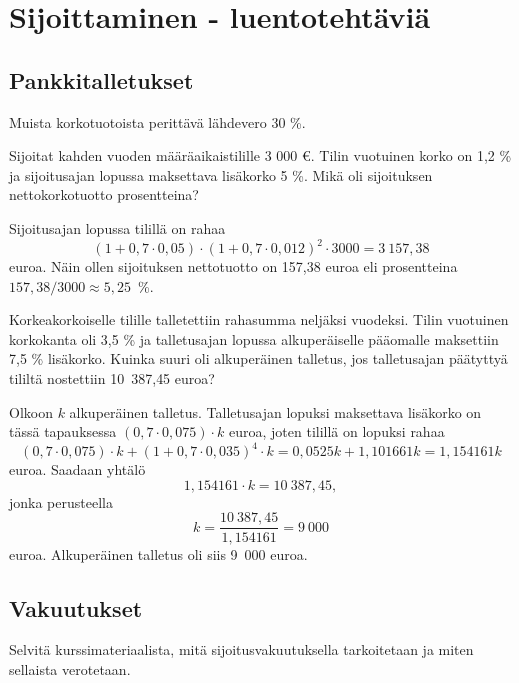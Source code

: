 \documentclass{article}\usepackage[]{graphicx}\usepackage[]{color}
\begin{document}
\section*{Sijoittaminen - luentotehtäviä}

\subsection*{Pankkitalletukset}

Muista korkotuotoista perittävä lähdevero 30 \%.

\begin{question} 
  Sijoitat kahden vuoden määräaikaistilille 3 000 \euro. Tilin vuotuinen korko on 1{,}2 \% ja sijoitusajan lopussa maksettava lisäkorko 5 \%. Mikä oli sijoituksen nettokorkotuotto prosentteina?
\end{question}
\begin{solution}

Sijoitusajan lopussa tilillä on rahaa 
\[
(1+0,7\cdot 0,05)\cdot(1+0,7\cdot 0,012)^2\cdot3000 = 3~157{,}38
\]
euroa. Näin ollen sijoituksen nettotuotto on 157{,}38 euroa eli prosentteina \(157{,}38/3000\approx 5{,}25\)~\%.
\end{solution}

\begin{question} Korkeakorkoiselle tilille talletettiin rahasumma neljäksi vuodeksi. Tilin vuotuinen korkokanta oli 3{,}5 \% ja talletusajan lopussa alkuperäiselle pääomalle maksettiin 7{,}5 \% lisäkorko. Kuinka suuri oli alkuperäinen talletus, jos talletusajan päätyttyä tililtä nostettiin 10~387{,}45 euroa?
\end{question}
\begin{solution}

  Olkoon \(k\) alkuperäinen talletus. Talletusajan lopuksi maksettava lisäkorko on tässä tapauksessa \((0,7\cdot0,075)\cdot k \) euroa, joten tilillä on lopuksi rahaa
  \[
    (0,7\cdot0,075)\cdot k + (1+0,7\cdot0,035)^4\cdot k = 0{,}0525k + 1{,}101661 k = 1{,}154161 k
  \]
euroa. Saadaan yhtälö
 \[
    1{,}154161\cdot k = 10~387{,}45,
  \]
jonka perusteella
\[
  k = \frac{10~387{,}45}{1{,}154161} = 9~000
\]
euroa. Alkuperäinen talletus oli siis 9~000 euroa.
\end{solution}

\subsection*{Vakuutukset}

\begin{question} 
Selvitä kurssimateriaalista, mitä sijoitusvakuutuksella tarkoitetaan ja miten sellaista verotetaan. 
\end{question}
\begin{solution}
\end{solution}
\end{document}
